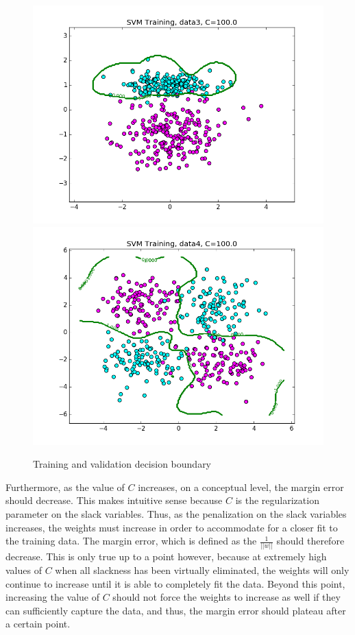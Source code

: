 \documentclass{article}
\begin{document}
\begin{figure}[width=\linewidth]
\begin{multicols}{2}
  \includegraphics[width=1.2\linewidth]{code/P2/rbf_training,C=100,data3.png}
  \includegraphics[width=1.2\linewidth]{code/P2/rbf_training,C=100,data4.png}
\end{multicols}
\caption{Training and validation decision boundary}
\end{figure}

Furthermore, as the value of $C$ increases, on a conceptual level, the margin error should decrease. This makes intuitive sense because $C$ is the regularization parameter on the slack variables. Thus, as the penalization on the slack variables increases, the weights must increase in order to accommodate for a closer fit to the training data. The margin error, which is defined as the $\frac{1}{||w||}$ should therefore decrease. This is only true up to a point however, because at extremely high values of $C$ when all slackness has been virtually eliminated, the weights will only continue to increase until it is able to completely fit the data. Beyond this point, increasing the value of $C$ should not force the weights to increase as well if they can sufficiently capture the data, and thus, the margin error should plateau after a certain point.
\end{document}
